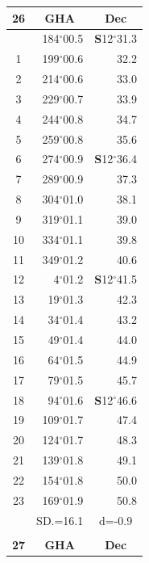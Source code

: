 \documentclass[10pt, a4paper]{report}
\begin{document}
\begin{scriptsize}
\begin{tabular*}{0.2\textwidth}[t]{@{\extracolsep{\fill}}|c|rr|}
\hline
\multicolumn{1}{|c|}{\rule{0pt}{2.6ex}\textbf{26}} & \multicolumn{1}{c}{\textbf{GHA}} & \multicolumn{1}{c|}{\textbf{Dec}}\\
\hline\rule{0pt}{2.6ex}\noindent
0 & 184$^\circ$00.5 & \textbf{S}12$^\circ$31.3\\
1 & 199$^\circ$00.6 & 32.2\\
2 & 214$^\circ$00.6 & 33.0\\
3 & 229$^\circ$00.7 & \raisebox{0.24ex}{\boldmath$\cdot$~\boldmath$\cdot$~~}33.9\\
4 & 244$^\circ$00.8 & 34.7\\
5 & 259$^\circ$00.8 & 35.6\\[2Pt]
6 & 274$^\circ$00.9 & \textbf{S}12$^\circ$36.4\\
7 & 289$^\circ$00.9 & 37.3\\
8 & 304$^\circ$01.0 & 38.1\\
9 & 319$^\circ$01.1 & \raisebox{0.24ex}{\boldmath$\cdot$~\boldmath$\cdot$~~}39.0\\
10 & 334$^\circ$01.1 & 39.8\\
11 & 349$^\circ$01.2 & 40.6\\[2Pt]
12 & 4$^\circ$01.2 & \textbf{S}12$^\circ$41.5\\
13 & 19$^\circ$01.3 & 42.3\\
14 & 34$^\circ$01.4 & 43.2\\
15 & 49$^\circ$01.4 & \raisebox{0.24ex}{\boldmath$\cdot$~\boldmath$\cdot$~~}44.0\\
16 & 64$^\circ$01.5 & 44.9\\
17 & 79$^\circ$01.5 & 45.7\\[2Pt]
18 & 94$^\circ$01.6 & \textbf{S}12$^\circ$46.6\\
19 & 109$^\circ$01.7 & 47.4\\
20 & 124$^\circ$01.7 & 48.3\\
21 & 139$^\circ$01.8 & \raisebox{0.24ex}{\boldmath$\cdot$~\boldmath$\cdot$~~}49.1\\
22 & 154$^\circ$01.8 & 50.0\\
23 & 169$^\circ$01.9 & 50.8\\
\hline
\rule{0pt}{2.4ex} & \multicolumn{1}{c}{SD.=16.1} & \multicolumn{1}{c|}{d=-0.9}\\
\hline
\multicolumn{1}{c}{}\\[-0.5ex]\hline
\multicolumn{1}{|c|}{\rule{0pt}{2.6ex}\textbf{27}} & \multicolumn{1}{c}{\textbf{GHA}} & \multicolumn{1}{c|}{\textbf{Dec}}\\

\end{tabular*}
\end{scriptsize}
\end{document}
